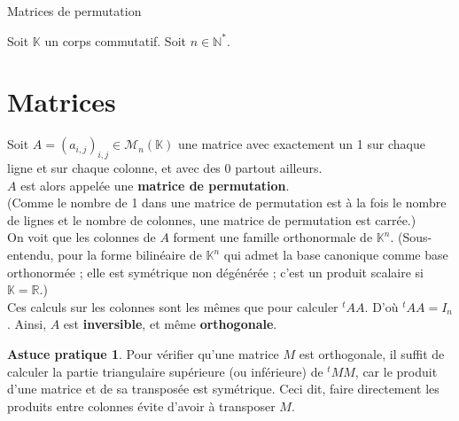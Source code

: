 \documentclass[10pt,a4paper,french,landscape]{article}
\date{}
\theoremstyle{definition}
\newtheorem*{as}{Astuce pratique}
\theoremstyle{remark}
\newcommand{\NNs}{\mathbb N^*}
\newcommand{\RR}{\mathbb R}
\newcommand{\KK}{\mathbb K}
\newcommand{\MM}{\mathcal M}
\newcommand{\1}{\mathbbm{1}}
\begin{document}



\begin{multicols*}{2}

{\Large Matrices de permutation}

\bigskip
Soit $\KK$ un corps commutatif. Soit $n\in\NNs$.

\vspace{-0.2cm}
\section{Matrices}
\label{sec:mat}

Soit $A=(a_{i,j})_{i,j}\in\MM_n(\KK)$ une matrice avec exactement un 1 sur chaque ligne et sur chaque colonne, et avec des 0 partout ailleurs.\\
$A$ est alors appelée une \textbf{matrice de permutation}.\\

(Comme le nombre de 1 dans une matrice de permutation est à la fois le nombre de lignes et le nombre de colonnes, une matrice de permutation est carrée.)\\

On voit que les colonnes de $A$ forment une famille orthonormale de $\KK^n$. (Sous-entendu, pour la forme bilinéaire de $\KK^n$ qui admet la base canonique comme base orthonormée ; elle est symétrique non dégénérée ; c'est un produit scalaire si $\KK=\RR$.)\\

Ces calculs sur les colonnes sont les mêmes que pour calculer $^tAA$. D'où $^tAA=I_n$.
Ainsi, $A$ est \textbf{inversible}, et même \textbf{orthogonale}.

\begin{as}
Pour vérifier qu'une matrice $M$ est orthogonale, il suffit de calculer la partie triangulaire supérieure (ou inférieure) de $^tMM$, car le produit d'une matrice et de sa transposée est symétrique. Ceci dit, faire directement les produits entre colonnes évite d'avoir à transposer $M$.
\end{as}


\end{multicols*}
\end{document}
